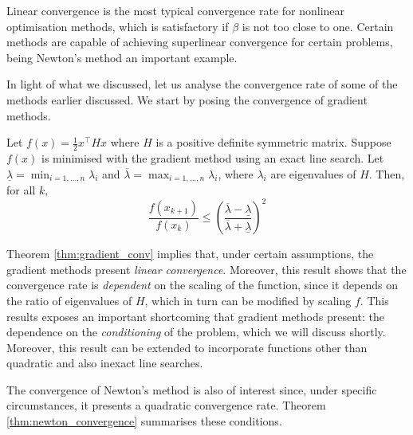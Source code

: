 Linear convergence is the most typical convergence rate for nonlinear optimisation methods, which is satisfactory if $\beta$ is not too close to one. Certain methods are capable of achieving superlinear convergence for certain problems, being Newton's method an important example.

In light of what we discussed, let us analyse the convergence rate of some of the methods earlier discussed. We start by posing the convergence of gradient methods.
%
\begin{theorem} \label{thm:gradient_conv}
Let $f(x) = \frac{1}{2}x^\top Hx$ where $H$ is a positive definite symmetric matrix. Suppose $f(x)$ is minimised with the gradient method using an exact line search. Let $\underline{\lambda} = \min_{i=1,\dots,n}\lambda_i$ and $\overline{\lambda} = \max_{i=1,\dots,n}\lambda_i$, where $\lambda_i$ are eigenvalues of $H$. Then, for all $k$,
$$ \frac{f(x_{k+1})}{f(x_k)} \leq \left(\frac{\overline{\lambda}-\underline{\lambda}}{\overline{\lambda}+\underline{\lambda}}\right)^2
$$
\end{theorem}

Theorem \ref{thm:gradient_conv} implies that, under certain assumptions, the gradient methods present \emph{linear convergence}. Moreover, this result shows that the convergence rate is \emph{dependent} on the scaling of the function, since it depends on the ratio of eigenvalues of $H$, which in turn can be modified by scaling $f$. This results exposes an important shortcoming that gradient methods present: the dependence on the \emph{conditioning} of the problem, which we will discuss shortly. Moreover, this result can be extended to incorporate functions other than quadratic and also inexact line searches. 

The convergence of Newton's method is also of interest since, under specific circumstances, it presents a  quadratic convergence rate. Theorem \ref{thm:newton_convergence} summarises these conditions.

